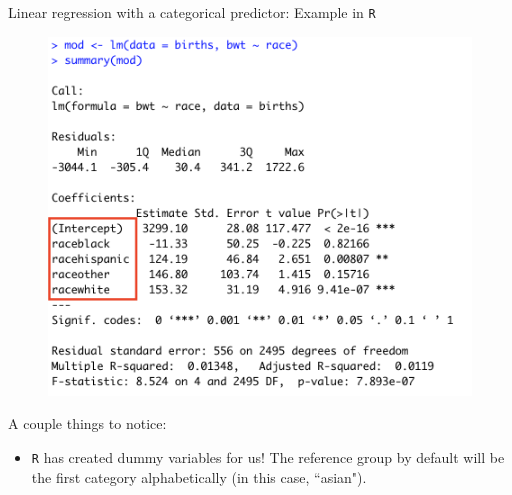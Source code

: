 \documentclass[10pt,t]{beamer}
\begin{document}
\begin{frame}{Linear regression with a categorical predictor: Example in \texttt{R}}

\begin{figure}
	\centering \includegraphics[scale=0.3]{multilevel_cat_lm2.png}
\end{figure}

\vspace{0.1cm}

A couple things to notice:
\begin{itemize}
	\item \texttt{R} has created dummy variables for us! The reference group by default will be the first category alphabetically (in this case, ``asian").
\end{itemize}

\end{frame}
\end{document}
